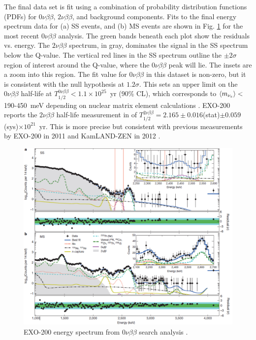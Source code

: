 The final data set is fit using a combination of probability distribution functions (PDFs) for $0\nu\beta\beta$, $2\nu\beta\beta$, and background components.  Fits to the final energy spectrum data for (a) SS events, and (b) MS events are shown in Fig. \ref{fig:exo200data} for the most recent $0\nu\beta\beta$ analysis.  The green bands beneath each plot show the residuals vs. energy.  The $2\nu\beta\beta$ spectrum, in gray, dominates the signal in the SS spectrum below the Q-value.  The vertical red lines in the SS spectrum outline the $\pm 2 \sigma$ region of interest around the Q-value, where the $0\nu\beta\beta$ peak will lie.  The insets are a zoom into this region.  The fit value for $0\nu\beta\beta$ in this dataset is non-zero, but it is consistent with the null hypothesis at $1.2 \sigma$.  This sets an upper limit on the $0\nu\beta\beta$ half-life at $T^{0\nu\beta\beta}_{1/2} < 1.1 \times 10^{25}$~yr (90\% CL), which corresponds to $\braket{m_{\nu_{e}}} < $190-450~meV depending on nuclear matrix element calculations \cite{EXO2000nuNature}.  EXO-200 reports the $2\nu\beta\beta$ half-life measurement in \cite{EXO200TwoNuLong} of $T^{2\nu\beta\beta}_{1/2} = 2.165 \pm 0.016$(stat)$ \pm 0.059$(sys)$ \times 10^{21}$~yr.  This is more precise but consistent with previous measurements by EXO-200 in 2011 \cite{EXO200TwoNuOriginal} and KamLAND-ZEN in 2012 \cite{KamLAND}.

\begin{figure} %
	\centering
	\includegraphics[width=.95\textwidth]{figures/0nu_spectrum_nature.png}
	\caption{EXO-200 energy spectrum from $0\nu\beta\beta$ search analysis \cite{EXO2000nuNature}.}
\label{fig:exo200data}
\end{figure}

